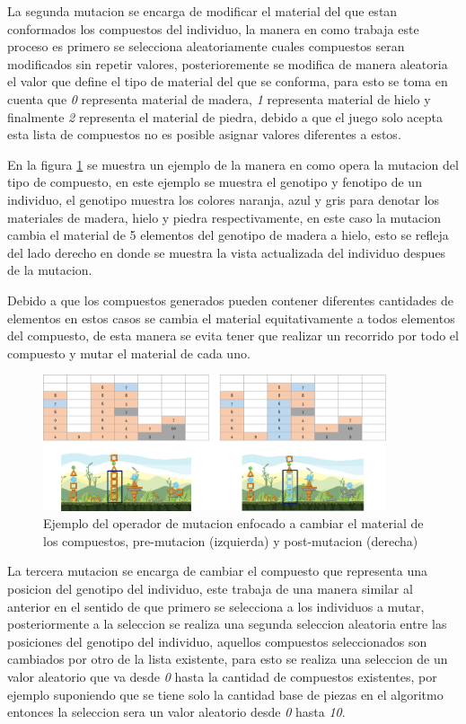 La segunda mutacion se encarga de modificar el material del que estan
conformados los compuestos del individuo, la manera en como trabaja este proceso
es primero se selecciona aleatoriamente cuales compuestos seran modificados sin
repetir valores, posterioremente se modifica de manera aleatoria el valor que
define el tipo de material del que se conforma, para esto se toma en cuenta que
\textit{0} representa material de madera, \textit{1} representa material de
hielo y finalmente \textit{2} representa el material de piedra, debido a que el
juego solo acepta esta lista de compuestos no es posible asignar valores
diferentes a estos.

En la figura \ref{figure:mutate_material} se muestra un ejemplo de la manera en
como opera la mutacion del tipo de compuesto, en este ejemplo se muestra el
genotipo y fenotipo de un individuo, el genotipo muestra los colores naranja,
azul y gris para denotar los materiales de madera, hielo y piedra
respectivamente, en este caso la mutacion cambia el material de 5 elementos del
genotipo de madera a hielo, esto se refleja del lado derecho en donde se muestra
la vista actualizada del individuo despues de la mutacion.

Debido a que los compuestos generados pueden contener diferentes cantidades de
elementos en estos casos se cambia el material equitativamente a todos elementos
del compuesto, de esta manera se evita tener que realizar un recorrido por todo
el compuesto y mutar el material de cada uno.

\begin{figure}
  \centering
  \includegraphics[width=0.9\textwidth]{img/mutation_material.png}
  \caption{Ejemplo del operador de mutacion enfocado a cambiar el material de los compuestos, pre-mutacion (izquierda) y post-mutacion (derecha)}
  \label{figure:mutate_material}
\end{figure}

La tercera mutacion se encarga de cambiar el compuesto que representa una
posicion del genotipo del individuo, este trabaja de una manera similar al
anterior en el sentido de que primero se selecciona a los individuos a mutar,
posteriormente a la seleccion se realiza una segunda seleccion aleatoria entre
las posiciones del genotipo del individuo, aquellos compuestos seleccionados son
cambiados por otro de la lista existente, para esto se realiza una seleccion de
un valor aleatorio que va desde \textit{0} hasta la cantidad de compuestos
existentes, por ejemplo suponiendo que se tiene solo la cantidad base de piezas
en el algoritmo entonces la seleccion sera un valor aleatorio desde \textit{0}
hasta \textit{10}.

